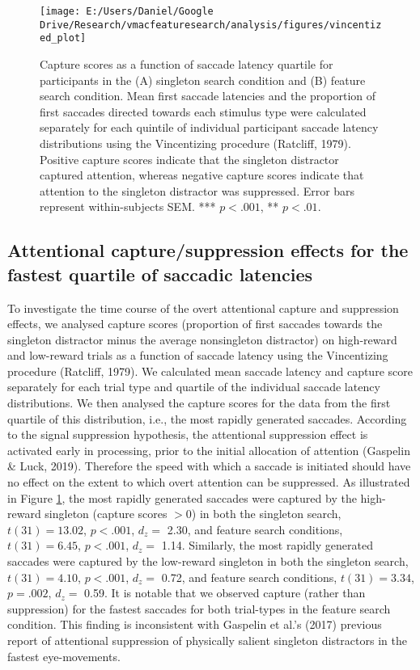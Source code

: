\documentclass[man, a4paper, noextraspace, 11pt,floatsintext]{apa6}
\begin{document}
\begin{figure}[!h]

{\centering \texttt{[image: E:/Users/Daniel/Google Drive/Research/vmacfeaturesearch/analysis/figures/vincentized\_plot]} 

}

\caption{Capture scores as a function of saccade latency
quartile for participants in the (A) singleton search condition and (B)
feature search condition. Mean first saccade latencies and the
proportion of first saccades directed towards each stimulus type were
calculated separately for each quintile of individual participant
saccade latency distributions using the Vincentizing procedure
(Ratcliff, 1979). Positive capture scores indicate that the singleton
distractor captured attention, whereas negative capture scores indicate
that attention to the singleton distractor was suppressed. Error bars
represent within-subjects SEM. *** \(p<.001\), ** \(p<.01\).}\label{fig:VincentizedPlot}
\end{figure}

\subsection{Attentional capture/suppression effects for the fastest
quartile of saccadic
latencies}\label{attentional-capturesuppression-effects-for-the-fastest-quartile-of-saccadic-latencies}

To investigate the time course of the overt attentional capture and
suppression effects, we analysed capture scores (proportion of first
saccades towards the singleton distractor minus the average nonsingleton
distractor) on high-reward and low-reward trials as a function of
saccade latency using the Vincentizing procedure (Ratcliff, 1979). We
calculated mean saccade latency and capture score separately for each
trial type and quartile of the individual saccade latency distributions.
We then analysed the capture scores for the data from the first quartile
of this distribution, i.e., the most rapidly generated saccades.
According to the signal suppression hypothesis, the attentional
suppression effect is activated early in processing, prior to the
initial allocation of attention (Gaspelin \& Luck, 2019). Therefore the
speed with which a saccade is initiated should have no effect on the
extent to which overt attention can be suppressed. As illustrated in
Figure \ref{fig:VincentizedPlot}, the most rapidly generated saccades
were captured by the high-reward singleton (capture scores \(>0\)) in
both the singleton search, \(t(31) = 13.02\), \(p < .001\), \(d_z=\)
2.30, and feature search conditions, \(t(31) = 6.45\), \(p < .001\),
\(d_z=\) 1.14. Similarly, the most rapidly generated saccades were
captured by the low-reward singleton in both the singleton search,
\(t(31) = 4.10\), \(p < .001\), \(d_z=\) 0.72, and feature search
conditions, \(t(31) = 3.34\), \(p = .002\), \(d_z=\) 0.59. It is notable
that we observed capture (rather than suppression) for the fastest
saccades for both trial-types in the feature search condition. This
finding is inconsistent with Gaspelin et al.'s (2017) previous report of
attentional suppression of physically salient singleton distractors in
the fastest eye-movements.
\end{document}
